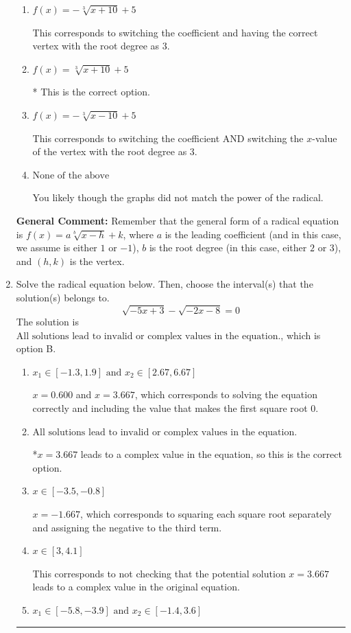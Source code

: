 \documentclass{extbook}[14pt]
\newcommand{\litem}[1]{\item #1

\rule{\textwidth}{0.4pt}}
\begin{document}
\begin{enumerate}
{\begin{enumerate}[label=\Alph*.]
This corresponds to the correct coefficient and switching the $x$-value of the vertex with the root degree as $3$.
\item \( f(x) = - \sqrt[3]{x + 10} + 5 \)

This corresponds to switching the coefficient and having the correct vertex with the root degree as $3$.
\item \( f(x) = \sqrt[3]{x + 10} + 5 \)

* This is the correct option.
\item \( f(x) = - \sqrt[3]{x - 10} + 5 \)

This corresponds to switching the coefficient AND switching the $x$-value of the vertex with the root degree as $3$.
\item \( \text{None of the above} \)

You likely though the graphs did not match the power of the radical.
\end{enumerate}

\textbf{General Comment:} Remember that the general form of a radical equation is $ f(x) = a \sqrt[b]{x - h} + k$, where $a$ is the leading coefficient (and in this case, we assume is either $1$ or $-1$), $b$ is the root degree (in this case, either $2$ or $3$), and $(h, k)$ is the vertex.
}
\litem{
Solve the radical equation below. Then, choose the interval(s) that the solution(s) belongs to.
\[ \sqrt{-5 x + 3} - \sqrt{-2 x - 8} = 0 \]The solution is \( \text{All solutions lead to invalid or complex values in the equation.} \), which is option B.\begin{enumerate}[label=\Alph*.]
\item \( x_1 \in [-1.3, 1.9] \text{ and } x_2 \in [2.67,6.67] \)

$x = 0.600$ and $x = 3.667$, which corresponds to solving the equation correctly and including the value that makes the first square root 0.
\item \( \text{All solutions lead to invalid or complex values in the equation.} \)

*$x = 3.667$ leads to a complex value in the equation, so this is the correct option.
\item \( x \in [-3.5,-0.8] \)

$x = -1.667$, which corresponds to squaring each square root separately and assigning the negative to the third term.
\item \( x \in [3,4.1] \)

This corresponds to not checking that the potential solution $x = 3.667$ leads to a complex value in the original equation.
\item \( x_1 \in [-5.8, -3.9] \text{ and } x_2 \in [-1.4,3.6] \)


\end{enumerate}}
\end{enumerate}
\end{document}
